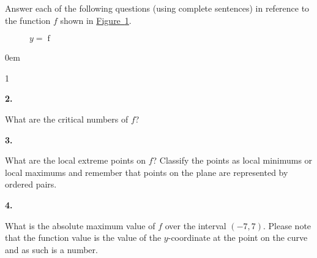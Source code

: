 \documentclass[12pt,]{book}
\theoremstyle{plain}
\theoremstyle{definition}
\numberwithin{equation}{section}
\newenvironment{exercisegroup}%
{\medskip\noindent}%
{\par\bigskip}%
\newlength{\exercisegroupindent}%
\newlength{\exercisegroupitemwidth}%
\newenvironment{exercisegrouplist}%
{\vspace{-\partopsep}%
\begin{adjustwidth}{\exercisegroupindent}{0em}}%
{\end{adjustwidth}%
\vspace{-\partopsep}%
\vspace{\baselineskip}}%
\newenvironment{exercisegroupbycol}[1]%
{\begin{exercisegrouplist}%
\vspace{-\multicolsep}%
\begin{multicols}{#1}%
\setlength{\parindent}{0em}%
\setlength{\exercisegroupitemwidth}{\linewidth}}%
{\end{multicols}%
\vspace{-\multicolsep}%
\end{exercisegrouplist}}%
\newenvironment{exercisegroupitem}[1]%
{\begin{minipage}[t]{\exercisegroupitemwidth}
\vspace{0pt}%
{\bfseries#1}%
\rule{0pt}{\baselineskip}}{\strut%
\end{minipage}%
\hspace{\columnsep}}%
\providecommand\phantomsection{}
\newcommand{\fe}[2]{\mathop{{#1}{\left(#2\right)}}}
\newcommand{\ointerval}[2]{\left(#1,#2\right)}
\begin{document}
\begin{exercisegroup}%
Answer each of the following questions (using complete sentences) in reference to the function \(f\) shown in \hyperref[figure-lots-of-critical-points]{Figure~\ref*{figure-lots-of-critical-points}}.%
\begin{figure}
\centering
{
}
\caption{\(y=\fe{f}{x}\)\label{figure-lots-of-critical-points}}
\end{figure}
\par
\begin{exercisegroupbycol}{1}%
\begin{exercisegroupitem}{2. }\phantomsection\hypertarget{exercise-4}{\null}
What are the critical numbers of \(f\)?%
\end{exercisegroupitem}%
\par%
\begin{exercisegroupitem}{3. }\phantomsection\hypertarget{exercise-5}{\null}
What are the local extreme points on \(f\)?  Classify the points as local minimums or local maximums and remember that points on the plane are represented by ordered pairs.%
\end{exercisegroupitem}%
\par%
\begin{exercisegroupitem}{4. }\phantomsection\hypertarget{exercise-6}{\null}
What is the absolute maximum value of \(f\) over the interval \(\ointerval{-7}{7}\).  Please note that the function value is the value of the \(y\)-coordinate at the point on the curve and as such is a number.%
\end{exercisegroupitem}%
\par%
\end{exercisegroupbycol}%
\end{exercisegroup}%
\end{document}
